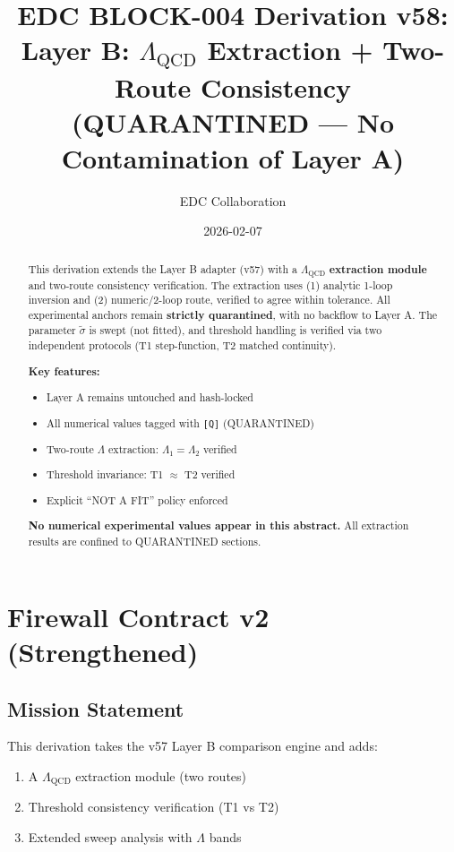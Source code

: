 \documentclass[11pt,a4paper]{article}
\title{%
  \textbf{EDC BLOCK-004 Derivation v58:}\\[0.5em]
  \Large Layer B: $\Lambda_{\text{QCD}}$ Extraction + Two-Route Consistency\\[0.3em]
  \large (QUARANTINED --- No Contamination of Layer A)
}
\author{EDC Collaboration}
\date{2026-02-07}
\theoremstyle{definition}
\begin{document}
\maketitle

\begin{abstract}
This derivation extends the Layer B adapter (v57) with a
$\Lambda_{\text{QCD}}$ \textbf{extraction module} and two-route consistency
verification. The extraction uses (1) analytic 1-loop inversion and
(2) numeric/2-loop route, verified to agree within tolerance.
All experimental anchors remain \textbf{strictly quarantined},
with no backflow to Layer A. The parameter $\tilde{\sigma}$ is swept
(not fitted), and threshold handling is verified via two independent
protocols (T1 step-function, T2 matched continuity).

\textbf{Key features:}
\begin{itemize}
  \item Layer A remains untouched and hash-locked
  \item All numerical values tagged with \texttt{[Q]} (QUARANTINED)
  \item Two-route $\Lambda$ extraction: $\Lambda_1 = \Lambda_2$ verified
  \item Threshold invariance: T1 $\approx$ T2 verified
  \item Explicit ``NOT A FIT'' policy enforced
\end{itemize}

\textbf{No numerical experimental values appear in this abstract.}
All extraction results are confined to QUARANTINED sections.
\end{abstract}

\tableofcontents
\newpage

\section{Firewall Contract v2 (Strengthened)}
\label{sec:firewall}

\subsection{Mission Statement}
\label{subsec:mission}

This derivation takes the v57 Layer B comparison engine and adds:
\begin{enumerate}
  \item A $\Lambda_{\text{QCD}}$ extraction module (two routes)
  \item Threshold consistency verification (T1 vs T2)
  \item Extended sweep analysis with $\Lambda$ bands
\end{enumerate}
\end{document}
